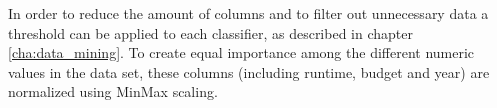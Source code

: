 In order to reduce the amount of columns and to filter out unnecessary data a threshold can be applied to each classifier, as described in chapter \ref{cha:data_mining}. To create equal importance among the different numeric values in the data set, these columns (including runtime, budget and year) are normalized using MinMax scaling.





